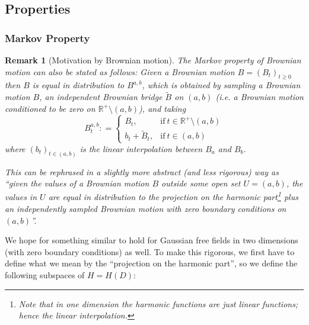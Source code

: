 \documentclass[11pt,reqno]{amsart}
\numberwithin{equation}{section}
\newtheorem{pro}[thm]{Proposition}
\newtheorem{rem}[thm]{Remark}
\newcommand{\deq}{\mathrel{\mathop:}=}
\begin{document}
\subsection{Properties}




\subsubsection{Markov Property}

\begin{rem}[Motivation by Brownian motion]\label{rem:alternativeMarkovforBM}
	The Markov property of Brownian motion can also be stated as follows: Given a Brownian motion $B=(B_t)_{t\geq 0}$ then $B$ is equal in distribution to $B^{a,b}$, which is obtained by sampling a Brownian motion $B$, an independent Brownian bridge $\tilde B$ on $(a,b)$ (i.e. a Brownian motion conditioned to be zero on $\mathbb R^+\setminus(a,b)$), and taking
	$$B^{a,b}_t\deq \begin{cases}
      B_t, & \text{if}\ t\in\mathbb R^+\setminus(a,b) \\
      b_t+\tilde B_t, & \text{if}\ t\in(a,b)
    \end{cases}$$ where $(b_t)_{t\in(a,b)}$ is the linear interpolation between $B_a$ and $B_b$.
	
	This can be rephrased in a slightly more abstract (and less rigorous) way as ``given the values of a Brownian motion $B$ outside some open set $U=(a,b)$, the values in $U$ are equal in distribution to the projection on the harmonic part\footnote{Note that in one dimension the harmonic functions are just linear functions; hence the linear interpolation.} plus an independently sampled Brownian motion with zero boundary conditions on $(a,b)$''.
\end{rem}

We hope for something similar to hold for Gaussian free fields in two dimensions (with zero boundary conditions) as well. To make this rigorous, we first have to define what we mean by the ``projection on the harmonic part'', so we define the following subspaces of $H=H(D)$:
\end{document}
